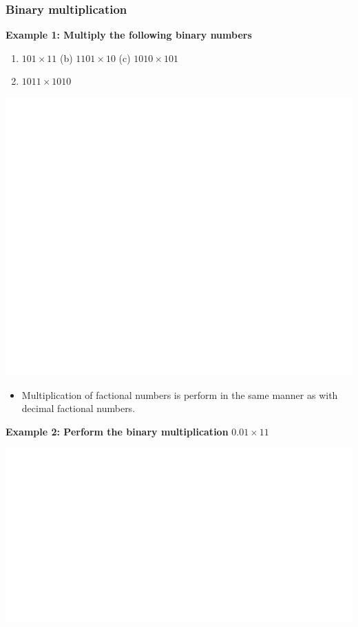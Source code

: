 \documentclass[]{book}
\providecommand{\tightlist}{%
  \setlength{\itemsep}{0pt}\setlength{\parskip}{0pt}}
\begin{document}
\hypertarget{binary-multiplication}{%
\subsubsection{Binary multiplication}\label{binary-multiplication}}

\textbf{Example 1: Multiply the following binary numbers}

\begin{enumerate}
\def\labelenumi{(\alph{enumi})}
\tightlist
\item
  \(101\times11\) (b) \(1101\times10\) (c) \(1010\times101\)
\item
  \(1011\times1010\)
\end{enumerate}

\begin{center}\includegraphics[width=1\linewidth]{figure/NSbox25-1} \end{center}

\begin{itemize}
\tightlist
\item
  Multiplication of factional numbers is perform in the same manner as with decimal factional numbers.
\end{itemize}

\textbf{Example 2: Perform the binary multiplication} \(0.01\times11\)

\begin{center}\includegraphics[width=1\linewidth]{figure/NSbox26-1} \end{center}
\end{document}
